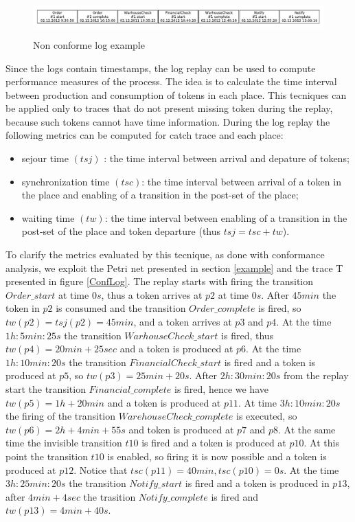 \documentclass[11pt]{article}
\begin{document}
\begin{figure}[h]\label{NonConfLog}
\centering
\includegraphics[width=400pt,height=40pt]
{./items/logNonConforme.pdf}
\caption{Non conforme log example}
\end{figure}

Since the logs contain timestamps, the log replay can be used to compute performance measures of the process. The idea is to calculate the time interval between production and consumption of tokens in each place. This tecniques can be applied only to traces that do not present missing token during the replay, because such tokens cannot have time information. During the log replay the following metrics can be computed for catch trace and each place:
\begin{itemize}
\item sejour time $(tsj)$ : the time interval between arrival and depature of tokens;
\item synchronization time $(tsc)$: the time interval between arrival of a token in the place and enabling of a transition in the post-set of the place;
\item waiting time $(tw)$:  the time interval between enabling of a transition in the post-set of the place and token departure (thus $tsj=tsc+tw $).
\end{itemize}

To clarify the metrics evaluated by this tecnique, as done with conformance analysis, we exploit the Petri net  presented in section \ref{example} and the trace T presented in figure \ref{ConfLog}. The replay starts with firing the transition $Order\_start$ at time $0s$, thus a token arrives at $p2$ at time $0s$. After $45 min$ the token in $p2$ is consumed and the transition $Order\_complete$ is fired, so $tw(p2)=tsj(p2)=45min$, and a token arrives at $p3$ and $p4$. At the time $1h:5min:25s$ the transition $WarhouseCheck\_start$ is fired, thus $tw(p4)=20min+25sec$ and a token is produced at $p6$. At the time $1h:10min:20s$ the transition $FinancialCheck\_start$ is fired and a token is produced at $p5$, so $tw(p3)=25min+20s$. After $2h:30min:20s$ from the replay start the transition $Financial\_complete$ is fired, hence we have $tw(p5)=1h+20min$ and a token is produced at $p11$. At time $3h:10min:20s$ the firing of the transition $WarehouseCheck\_complete$ is executed, so $tw(p6)=2h+4min+55s$ and token is produced at $p7$ and $p8$. At the same time the invisible transition $t10$ is fired and a token is produced at $p10$. At this point the transition $t10$ is enabled, so firing it is now possible and a token is produced at $p12$. Notice that $tsc(p11)=40min, tsc(p10)=0s$. At the time $3h:25min:20s$ the transition $Notify\_start$ is fired and a token is produced in $p13$, after $4min+4sec$ the trasition $Notify\_complete$ is fired and $tw(p13) = 4min+40s$.
\end{document}
